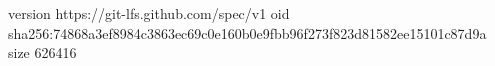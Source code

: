 version https://git-lfs.github.com/spec/v1
oid sha256:74868a3ef8984c3863ec69c0e160b0e9fbb96f273f823d81582ee15101c87d9a
size 626416
